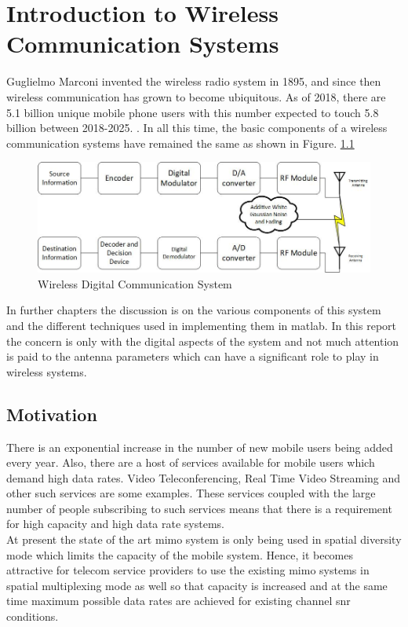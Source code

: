 \chapter{Introduction to Wireless Communication Systems} 
Guglielmo Marconi invented the wireless radio system in 1895, and since then wireless communication has grown to become ubiquitous. As of 2018, there are 5.1 billion unique mobile phone users with this number expected to touch 5.8 billion between 2018-2025. \parencite{George2017}.
In all this time, the basic components of a wireless communication systems have remained the same as shown in Figure. 
\ref{fig:wireless block diagram}
\begin{figure}[htb]
\centering
\includegraphics[scale=0.8]{Chapter 1/Figures/Wireless Communication System Block Diagram}
\caption{Wireless Digital Communication System}
\label{fig:wireless block diagram}
\end{figure}
 
In further chapters the discussion is on the various components of this system and the different techniques used in implementing them in \gls{matlab}. In this report the concern is only with the digital aspects of the system and not much attention is paid to the antenna parameters which can have a significant role to play in wireless systems. 


\section[Motivation]{\textbf{Motivation}}
There is an exponential increase in the number of new mobile users being added every year. Also, there are a host of services available for mobile users which demand high data rates. Video Teleconferencing, Real Time Video Streaming and other such services are some examples. These services coupled with the large number of people subscribing to such services means that there is a requirement for high capacity and high data rate systems.\\

At present the state of the art \acrshort{mimo} system is only being used in \gls{spatial diversity} mode which limits the capacity of the mobile system. Hence, it becomes attractive for telecom service providers to use the existing \acrshort{mimo} systems in \gls{spatial multiplexing} mode as well so that capacity is increased and at the same time maximum possible data rates are achieved for existing channel \acrshort{snr} conditions.  

